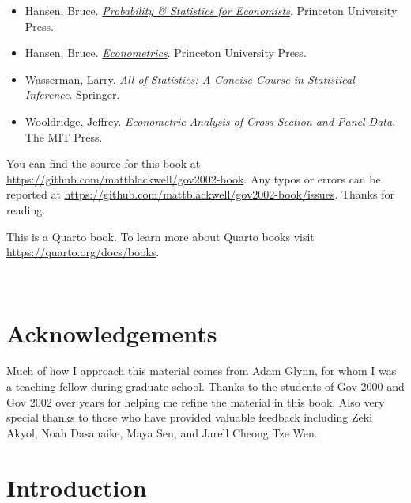 \documentclass[
  letterpaper,
  DIV=11,
  numbers=noendperiod]{scrreprt}
\providecommand{\tightlist}{%
  \setlength{\itemsep}{0pt}\setlength{\parskip}{0pt}}\usepackage{longtable,booktabs,array}
\theoremstyle{plain}
\theoremstyle{definition}
\theoremstyle{definition}
\theoremstyle{remark}
\begin{document}
\begin{itemize}
\tightlist
\item
  Hansen, Bruce.
  \href{https://www.amazon.com/Probability-Statistics-Economists-Bruce-Hansen/dp/0691235945/}{\emph{Probability
  \& Statistics for Economists}}. Princeton University Press.
\item
  Hansen, Bruce.
  \href{https://www.amazon.com/Econometrics-Bruce-Hansen/dp/0691235899/}{\emph{Econometrics}}.
  Princeton University Press.
\item
  Wasserman, Larry.
  \href{https://link.springer.com/book/10.1007/978-0-387-21736-9}{\emph{All
  of Statistics: A Concise Course in Statistical Inference}}. Springer.
\item
  Wooldridge, Jeffrey.
  \href{https://mitpress.mit.edu/9780262232586/econometric-analysis-of-cross-section-and-panel-data/}{\emph{Econometric
  Analysis of Cross Section and Panel Data}}. The MIT Press.
\end{itemize}

You can find the source for this book at
\url{https://github.com/mattblackwell/gov2002-book}. Any typos or errors
can be reported at
\url{https://github.com/mattblackwell/gov2002-book/issues}. Thanks for
reading.

This is a Quarto book. To learn more about Quarto books visit
\url{https://quarto.org/docs/books}.

\(\,\)


\hypertarget{acknowledgements}{%
\chapter*{Acknowledgements}\label{acknowledgements}}


Much of how I approach this material comes from Adam Glynn, for whom I
was a teaching fellow during graduate school. Thanks to the students of
Gov 2000 and Gov 2002 over years for helping me refine the material in
this book. Also very special thanks to those who have provided valuable
feedback including Zeki Akyol, Noah Dasanaike, Maya Sen, and Jarell
Cheong Tze Wen.


\hypertarget{introduction}{%
\chapter{Introduction}\label{introduction}}
\end{document}

